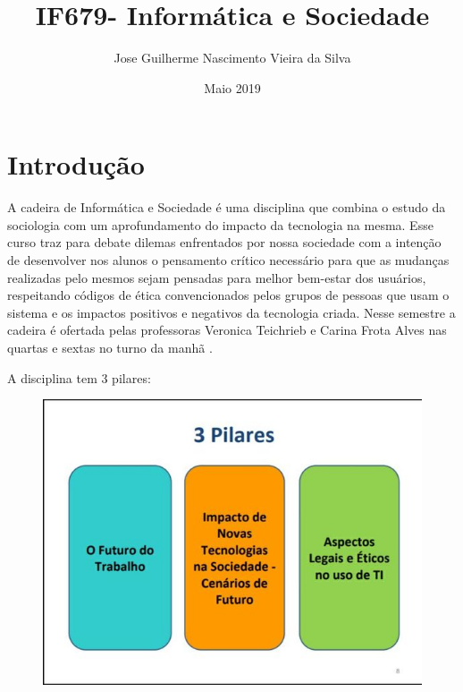 \documentclass[10pt]{article}
\title{IF679- Informática e Sociedade}
\author{Jose Guilherme Nascimento Vieira da Silva}
\date{Maio 2019}
\begin{document}
\maketitle

\section{Introdução}
A cadeira de Informática e Sociedade é uma disciplina que combina o estudo da sociologia com um aprofundamento do impacto da tecnologia na mesma\cite{ProgramaInfosoc}. Esse curso traz para debate dilemas
enfrentados por nossa sociedade com a intenção de desenvolver nos alunos o pensamento crítico necessário para que as mudanças realizadas pelo mesmos sejam pensadas para melhor bem-estar dos usuários, respeitando códigos de ética convencionados pelos grupos de pessoas que usam o sistema e os impactos positivos e negativos da tecnologia criada. Nesse semestre a cadeira é ofertada pelas professoras Veronica
Teichrieb
e Carina Frota Alves nas quartas e sextas no turno da manhã \cite{PetInfosoc}.

A disciplina tem 3 pilares:
   \begin{figure}
   \begin{center}
    \includegraphics[scale=0.3]{jgnvs.jpg}   
   \end{center}
   \end{figure}
\end{document}
